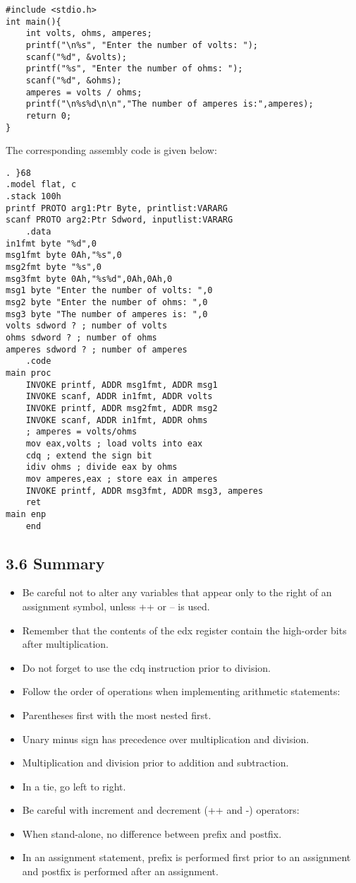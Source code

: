 \documentclass[10pt]{article}
\begin{document}
\begin{verbatim}
#include <stdio.h>
int main(){
    int volts, ohms, amperes;
    printf("\n%s", "Enter the number of volts: ");
    scanf("%d", &volts);
    printf("%s", "Enter the number of ohms: ");
    scanf("%d", &ohms);
    amperes = volts / ohms;
    printf("\n%s%d\n\n","The number of amperes is:",amperes);
    return 0;
}
\end{verbatim}

The corresponding assembly code is given below:

\begin{verbatim}
. }68
.model flat, c
.stack 100h
printf PROTO arg1:Ptr Byte, printlist:VARARG
scanf PROTO arg2:Ptr Sdword, inputlist:VARARG
    .data
in1fmt byte "%d",0
msg1fmt byte 0Ah,"%s",0
msg2fmt byte "%s",0
msg3fmt byte 0Ah,"%s%d",0Ah,0Ah,0
msg1 byte "Enter the number of volts: ",0
msg2 byte "Enter the number of ohms: ",0
msg3 byte "The number of amperes is: ",0
volts sdword ? ; number of volts
ohms sdword ? ; number of ohms
amperes sdword ? ; number of amperes
    .code
main proc
    INVOKE printf, ADDR msg1fmt, ADDR msg1
    INVOKE scanf, ADDR in1fmt, ADDR volts
    INVOKE printf, ADDR msg2fmt, ADDR msg2
    INVOKE scanf, ADDR in1fmt, ADDR ohms
    ; amperes = volts/ohms
    mov eax,volts ; load volts into eax
    cdq ; extend the sign bit
    idiv ohms ; divide eax by ohms
    mov amperes,eax ; store eax in amperes
    INVOKE printf, ADDR msg3fmt, ADDR msg3, amperes
    ret
main enp
    end
\end{verbatim}

\subsection*{3.6 Summary}
\begin{itemize}
  \item Be careful not to alter any variables that appear only to the right of an assignment symbol, unless ++ or -- is used.
  \item Remember that the contents of the edx register contain the high-order bits after multiplication.
  \item Do not forget to use the cdq instruction prior to division.
  \item Follow the order of operations when implementing arithmetic statements:
  \item Parentheses first with the most nested first.
  \item Unary minus sign has precedence over multiplication and division.
  \item Multiplication and division prior to addition and subtraction.
  \item In a tie, go left to right.
  \item Be careful with increment and decrement (++ and -) operators:
  \item When stand-alone, no difference between prefix and postfix.
  \item In an assignment statement, prefix is performed first prior to an assignment and postfix is performed after an assignment.
\end{itemize}
\end{document}
